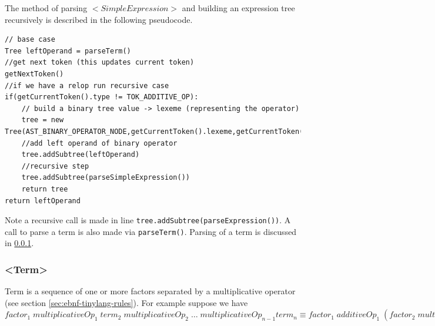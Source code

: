 The method of parsing $<SimpleExpression>$ and building an expression tree recursively is described in the following pseudocode.
\begin{lstlisting}[caption=parsing \emph{<SimpleExpression>} and building an expression tree (\emph{parseSimpleExpression()})]
// base case
Tree leftOperand = parseTerm()
//get next token (this updates current token) 
getNextToken()
//if we have a relop run recursive case
if(getCurrentToken().type != TOK_ADDITIVE_OP):
    // build a binary tree value -> lexeme (representing the operator)
    tree = new Tree(AST_BINARY_OPERATOR_NODE,getCurrentToken().lexeme,getCurrentToken().lineNumber)
    //add left operand of binary operator
    tree.addSubtree(leftOperand)
    //recursive step
    tree.addSubtree(parseSimpleExpression())
    return tree
return leftOperand
\end{lstlisting}
Note a recursive call is made in line \verb!tree.addSubtree(parseExpression())!. A call to parse a term is also made via \verb!parseTerm()!. Parsing of a term is discussed in \ref{sec:parse term expresion}.

\subsubsection{<Term>}
\label{sec:parse term expresion}
Term  is a sequence of one or more  factors separated by a multiplicative operator (see section \ref{sec:ebnf-tinylang-rules}). For example suppose we have $factor_1 \; multiplicativeOp_1  \; term_2 \;  multiplicativeOp_2  \; \ldots \; multiplicativeOp_{n-1} term_n \equiv  factor _1 \; additiveOp_1  \; (factor_2 \;  multiplicativeOp_2  \; \ldots  (factor_{n-1}\; multiplicativeOp_{n-1} factor_n))$




